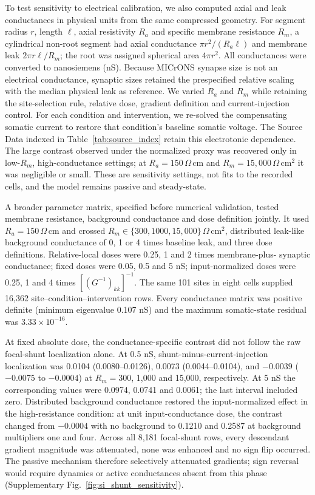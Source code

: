 To test sensitivity to electrical calibration, we also computed axial and
leak conductances in physical units from the same compressed geometry. For
segment radius $r$, length $\ell$, axial resistivity $R_a$ and specific
membrane resistance $R_m$, a cylindrical non-root segment had axial conductance
$\pi r^2/(R_a\ell)$ and membrane leak $2\pi r\ell/R_m$; the root was assigned
spherical area $4\pi r^2$. All conductances were converted to nanosiemens (nS). Because MICrONS
synapse size is not an electrical conductance, synaptic sizes retained the
prespecified relative scaling with the median physical leak as reference. We
varied $R_a$ and $R_m$ while retaining the site-selection rule, relative dose, gradient definition and current-injection control. For each condition and intervention, we re-solved the compensating somatic current to restore that condition's baseline somatic voltage. The Source Data indexed in Table~\ref{tab:source_index} retain this electrotonic dependence. The large contrast observed under the normalized proxy was recovered only in
low-$R_m$, high-conductance settings; at
$R_a=150\,\Omega\,\mathrm{cm}$ and
$R_m=15{,}000\,\Omega\,\mathrm{cm}^2$ it was negligible or small. These are
sensitivity settings, not fits to the recorded cells, and the model remains
passive and steady-state.

A broader parameter matrix, specified before numerical validation, tested
membrane resistance, background conductance and dose definition jointly. It used
\(R_a=150\,\Omega\,\mathrm{cm}\) and crossed
\(R_m\in\{300,1000,15{,}000\}\,\Omega\,\mathrm{cm}^2\), distributed leak-like
background conductance of 0, 1 or 4 times baseline leak, and three dose
definitions. Relative-local doses were 0.25, 1 and 2 times membrane-plus-
synaptic conductance; fixed doses were 0.05, 0.5 and 5 nS; input-normalized
doses were 0.25, 1 and 4 times $[(G^{-1})_{kk}]^{-1}$. The same 101 sites in
eight cells supplied 16,362 site--condition--intervention rows. Every
conductance matrix was positive definite (minimum eigenvalue 0.107 nS) and the
maximum somatic-state residual was $3.33\times10^{-16}$.

At fixed absolute dose, the conductance-specific contrast did not follow the
raw focal-shunt localization alone. At 0.5 nS, shunt-minus-current-injection
localization was 0.0104 (0.0080--0.0126), 0.0073 (0.0044--0.0104), and
$-0.0039$ ($-0.0075$ to $-0.0004$) at $R_m=300$, 1,000 and 15,000,
respectively. At 5 nS the corresponding values were 0.0974, 0.0741 and 0.0061;
the last interval included zero. Distributed background conductance restored
the input-normalized effect in the high-resistance condition: at unit
input-conductance dose, the contrast changed from $-0.0004$ with no background
to 0.1210 and 0.2587 at background multipliers one and four. Across all 8,181
focal-shunt rows, every descendant gradient magnitude was attenuated, none was
enhanced and no sign flip occurred. The passive mechanism therefore selectively attenuated gradients; sign
reversal would require dynamics or active conductances absent from this phase (Supplementary Fig.~\ref{fig:si_shunt_sensitivity}).

